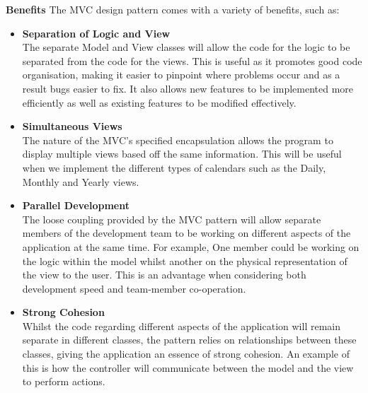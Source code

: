 \documentclass[a4paper]{article}
\begin{document}
\textbf{Benefits}
The MVC design pattern comes with a variety of benefits, such as:
\begin{itemize}
    \item \textbf{Separation of Logic and View} \\
    The separate Model and View classes will allow the code for the logic to be separated from the code for the views. This is useful as it promotes good code organisation, making it easier to pinpoint where problems occur and as a result bugs easier to fix. It also allows new features to be implemented more efficiently as well as existing features to be modified effectively. \\
    \item \textbf{Simultaneous Views} \\
    The nature of the MVC's specified encapsulation allows the program to display multiple views based off the same information. This will be useful when we implement the different types of calendars such as the Daily, Monthly and Yearly views. \\
    \item \textbf{Parallel Development} \\
    The loose coupling provided by the MVC pattern will allow separate members of the development team to be working on different aspects of the application at the same time. For example, One member could be working on the logic within the model whilst another on the physical representation of the view to the user. This is an advantage when considering both development speed and team-member co-operation. \\
    \item \textbf{Strong Cohesion} \\
    Whilst the code regarding different aspects of the application will remain separate in different classes, the pattern relies on relationships between these classes, giving the application an essence of strong cohesion. An example of this is how the controller will communicate between the model and the view to perform actions.
\end{itemize}
\end{document}
